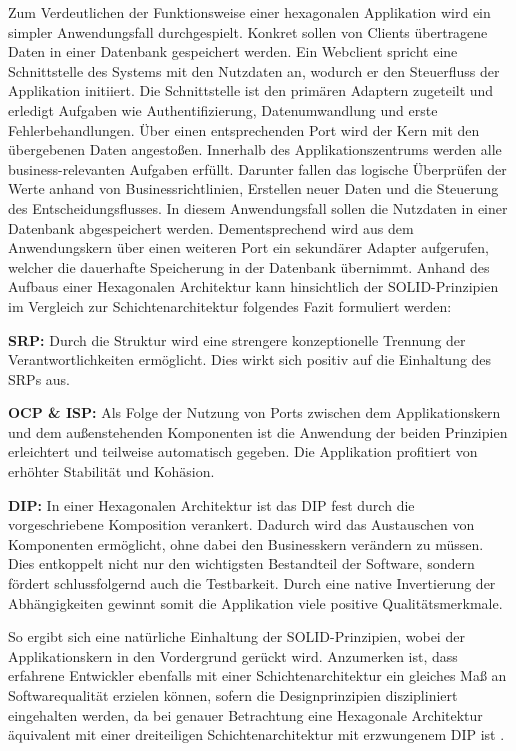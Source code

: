 Zum Verdeutlichen der Funktionsweise einer hexagonalen Applikation wird ein simpler Anwendungsfall durchgespielt. Konkret sollen von Clients übertragene Daten in einer Datenbank gespeichert werden. Ein Webclient spricht eine Schnittstelle des Systems mit den Nutzdaten an, wodurch er den Steuerfluss der Applikation initiiert. Die Schnittstelle ist den primären Adaptern zugeteilt und erledigt Aufgaben wie Authentifizierung, Datenumwandlung und erste Fehlerbehandlungen. Über einen entsprechenden Port wird der Kern mit den übergebenen Daten angestoßen. Innerhalb des Applikationszentrums werden alle business-relevanten Aufgaben erfüllt. Darunter fallen das logische Überprüfen der Werte anhand von Businessrichtlinien, Erstellen neuer Daten und die Steuerung des Entscheidungsflusses. In diesem Anwendungsfall sollen die Nutzdaten in einer Datenbank abgespeichert werden. Dementsprechend wird aus dem Anwendungskern über einen weiteren Port ein sekundärer Adapter aufgerufen, welcher die dauerhafte Speicherung in der Datenbank übernimmt. Anhand des Aufbaus einer Hexagonalen Architektur kann hinsichtlich der SOLID-Prinzipien im Vergleich zur Schichtenarchitektur folgendes Fazit formuliert werden:

\textbf{\acrlong{SRP}: } {Durch die Struktur wird eine strengere konzeptionelle Trennung der Verantwortlichkeiten ermöglicht. Dies wirkt sich positiv auf die Einhaltung des \acrlong{SRP}s aus.}

\textbf{\acrlong{OCP} \& \acrlong{ISP}: } {Als Folge der Nutzung von Ports zwischen dem Applikationskern und dem außenstehenden Komponenten ist die Anwendung der beiden Prinzipien erleichtert und teilweise automatisch gegeben. Die Applikation profitiert von erhöhter Stabilität und Kohäsion. }

\textbf{\acrlong{DIP}: } {In einer Hexagonalen Architektur ist das \acrlong{DIP} fest durch die vorgeschriebene Komposition verankert. Dadurch wird das Austauschen von Komponenten ermöglicht, ohne dabei den Businesskern verändern zu müssen. Dies entkoppelt nicht nur den wichtigsten Bestandteil der Software, sondern fördert schlussfolgernd auch die Testbarkeit. Durch eine native Invertierung der Abhängigkeiten gewinnt somit die Applikation viele positive Qualitätsmerkmale. \cite{Alliaume.2018, Martinez.2021}}

So ergibt sich eine natürliche Einhaltung der SOLID-Prinzipien, wobei der Applikationskern in den Vordergrund gerückt wird. Anzumerken ist, dass erfahrene Entwickler ebenfalls mit einer Schichtenarchitektur ein gleiches Maß an Softwarequalität erzielen können, sofern die Designprinzipien diszipliniert eingehalten werden, da bei genauer Betrachtung eine Hexagonale Architektur äquivalent mit einer dreiteiligen Schichtenarchitektur mit erzwungenem \acrlong{DIP} ist \cite{Seemann.2013} \cite[S. 125ff.]{Vernon.2015}. 



